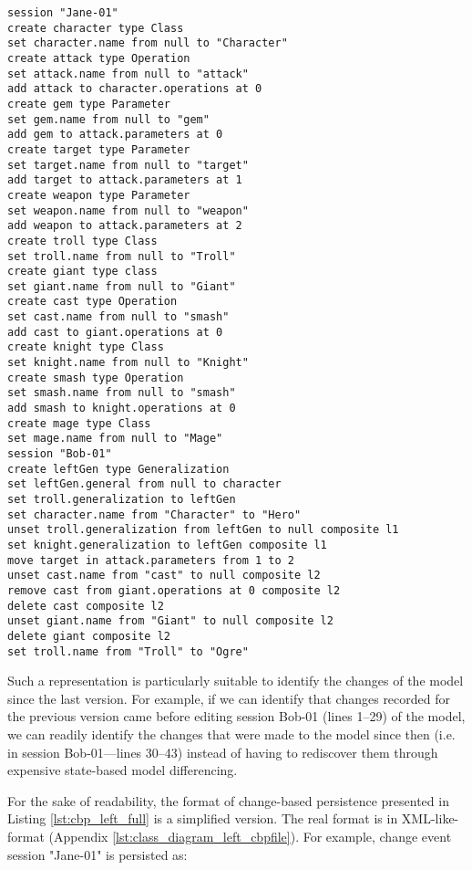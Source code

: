 \vspace{-20pt}
\begin{lstlisting}[style=eol,float=tp,escapechar=|,caption={The complete change events of Bob’s model in Figure \ref{fig:class_diagram_left}.},label=lst:cbp_left_full]
session "Jane-01"
create character type Class
set character.name from null to "Character"
create attack type Operation
set attack.name from null to "attack"
add attack to character.operations at 0
create gem type Parameter
set gem.name from null to "gem"
add gem to attack.parameters at 0
create target type Parameter
set target.name from null to "target"
add target to attack.parameters at 1
create weapon type Parameter
set weapon.name from null to "weapon"
add weapon to attack.parameters at 2
create troll type Class
set troll.name from null to "Troll"
create giant type class
set giant.name from null to "Giant"
create cast type Operation
set cast.name from null to "smash"
add cast to giant.operations at 0
create knight type Class
set knight.name from null to "Knight"
create smash type Operation
set smash.name from null to "smash"
add smash to knight.operations at 0
create mage type Class
set mage.name from null to "Mage"
session "Bob-01"
create leftGen type Generalization
set leftGen.general from null to character
set troll.generalization to leftGen
set character.name from "Character" to "Hero"
unset troll.generalization from leftGen to null composite l1
set knight.generalization to leftGen composite l1
move target in attack.parameters from 1 to 2
unset cast.name from "cast" to null composite l2
remove cast from giant.operations at 0 composite l2
delete cast composite l2
unset giant.name from "Giant" to null composite l2
delete giant composite l2
set troll.name from "Troll" to "Ogre"
\end{lstlisting}

Such a representation is particularly suitable to identify the changes of the model since the last version. For example, if we can identify that changes recorded for the previous version came before editing session \textsf{Bob-01} (lines 1–29) of the model, we can readily identify the changes that were made to the model since then (i.e. in session \textsf{Bob-01}—lines 30–43) instead of having to rediscover them through expensive state-based model differencing.

For the sake of readability, the format of change-based persistence presented in Listing \ref{lst:cbp_left_full} is a simplified version. The real format is in XML-like-format (Appendix \ref{lst:class_diagram_left_cbpfile}). For example, change event \textsf{session "Jane-01"} is persisted as:

